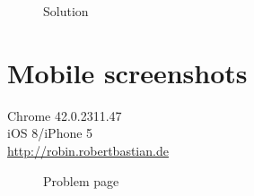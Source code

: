 \documentclass{report}
\begin{document}
\begin{figure}
\caption{Solution}
\end{figure}

\chapter{Mobile screenshots}
Chrome 42.0.2311.47\\iOS 8/iPhone 5\\\url{http://robin.robertbastian.de}

\begin{figure}
\caption{Problem page}
\end{figure}
\end{document}
